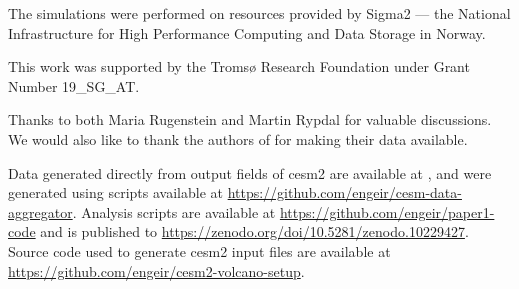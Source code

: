 \documentclass{ametsocV6.1}
\begin{document}
The simulations were performed on resources provided by Sigma2 --- the National
Infrastructure for High Performance Computing and Data Storage in Norway.

This work was supported by the Tromsø Research Foundation under Grant Number 19\_SG\_AT.

Thanks to both Maria Rugenstein and Martin Rypdal for valuable discussions. We would
also like to thank the authors of \citet{gregory2016, ottobliesner2016,
  marshall2020dataset} for making their data available.

%
%
\datastatement{}

Data generated directly from output fields of \gls{cesm2} are available at
\citet{enger2024}, and were generated using scripts available at
\url{https://github.com/engeir/cesm-data-aggregator}. Analysis scripts are available at
\url{https://github.com/engeir/paper1-code} and is published to
\url{https://zenodo.org/doi/10.5281/zenodo.10229427}. Source code used to generate
\gls{cesm2} input files are available at
\url{https://github.com/engeir/cesm2-volcano-setup}.

%






%
\end{document}
